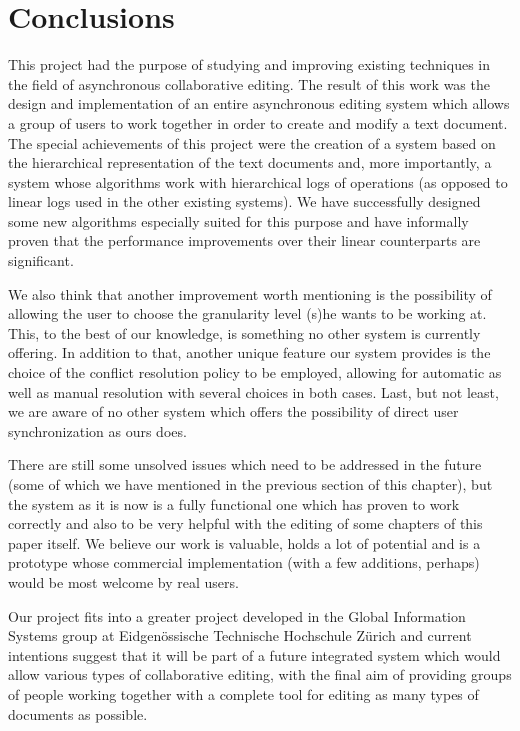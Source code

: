 \section{Conclusions}

This project had the purpose of studying and improving existing techniques in the field of 
asynchronous collaborative editing. The result of this work was the design and implementation
of an entire asynchronous editing system which allows a group of users to work together
in order to create and modify a text document. The special achievements of this project were
the creation of a system based on the hierarchical representation of the text documents and,
more importantly, a system whose algorithms work with hierarchical logs of operations (as
opposed to linear logs used in the other existing systems). We have successfully designed
some new algorithms especially suited for this purpose and have informally proven that the
performance improvements over their linear counterparts are significant.

We also think that another improvement worth mentioning is the possibility of allowing the
user to choose the granularity level (s)he wants to be working at. This, to the best of our
knowledge, is something no other system is currently offering. In addition to that, another
unique feature our system provides is the choice of the conflict resolution policy to be
employed, allowing for automatic as well as manual resolution with several choices in both
cases. Last, but not least, we are aware of no other system which offers the possibility of
direct user synchronization as ours does.

There are still some unsolved issues which need to be addressed in the future (some of which
we have mentioned in the previous section of this chapter), but the system as it is now is
a fully functional one which has proven to work correctly and also to be very helpful
with the editing of some chapters of this paper itself. We believe our work is valuable,
holds a lot of potential and is a prototype whose commercial implementation (with a few additions,
perhaps) would be most welcome by real users.

Our project fits into a greater project developed in the Global Information Systems group at
Eidgen\" ossische Technische Hochschule Z\" urich and current intentions suggest that it will be
part of a future integrated system which would allow various types of collaborative editing,
with the final aim of providing groups of people working together with a complete tool for editing
as many types of documents as possible.
